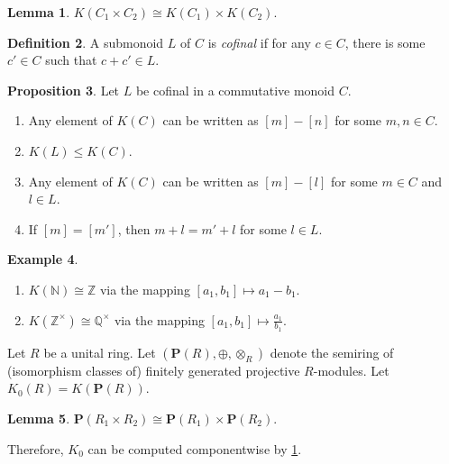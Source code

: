 \documentclass[10pt,letterpaper,cm]{nupset}
\theoremstyle{definition}
\newtheorem{definition}{Definition}[section]
\newtheorem{exmp}[definition]{Example}
\theoremstyle{theorem}
\newtheorem{lemma}[definition]{Lemma}
\newtheorem{prop}[definition]{Proposition}
\theoremstyle{remark}
\newcommand{\N}{\mathbb N}
\renewcommand{\P}{\mathbf P}
\newcommand{\Q}{\mathbb Q}
\newcommand{\Z}{\mathbb Z}
\newcommand{\1}{\mathbf{1}}
\newcommand{\0}{\vec 0}
\begin{document}
\begin{lemma}\label{L2}
$K(C_1 \times C_2) \cong K(C_1) \times K(C_2)$.
\end{lemma}

\begin{definition}
A submonoid $L$ of $C$ is \textit{cofinal} if for any $c\in C$, there is some $c' \in C$ such that $c + c' \in L$.
\end{definition}

\begin{prop}\label{prop2} Let $L$ be cofinal in a commutative monoid $C$.
\begin{enumerate}
\item Any element of $K(C)$ can be written as $\left[m\right]-\left[n\right]$ for some $m, n\in  C$.
\item $K(L) \leq K(C)$.
\item Any element of $K(C)$ can be written as $\left[m\right] - \left[l\right]$ for some $m\in C$ and $l\in L$.
\item If $[m] = [m']$, then $m + l = m' +l$ for some $l\in L$.
\end{enumerate}
\end{prop}

\begin{exmp}\label{Z} $ $
\begin{enumerate}
\item $K(\N) \cong \Z$ via the mapping $\left[a_1, b_1\right] \mapsto a_1 - b_1$.
\item $K(\Z^{\times}) \cong \Q^{\times}$ via the mapping $\left[a_1, b_1\right] \mapsto \frac{a_1}{b_1}$.
\end{enumerate}
\end{exmp}

\smallskip


Let $R$ be a unital ring. Let $\left(\P(R), \oplus, \otimes_R\right)$ denote the semiring  of (isomorphism classes of) finitely generated projective $R$-modules. Let $K_0(R) = K(\P(R))$.

\begin{lemma}
$\P(R_1 \times R_2) \cong \P(R_1) \times \P(R_2)$.  
\end{lemma}

Therefore, $K_0$ can be computed componentwise by \cref{L2}.

\smallskip
\end{document}
